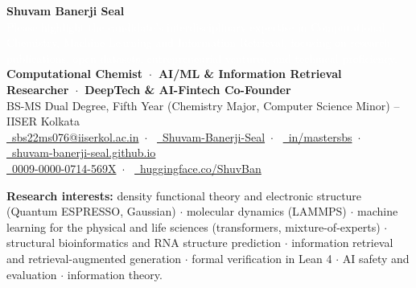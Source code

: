 \documentclass[a4paper,10.5pt]{extarticle}
\begin{document}
\color{darktext}

\begin{center}
  {\LARGE\bfseries Shuvam Banerji Seal}\\[0.15em]
  \textcolor{white}{\fontsize{3}{3}\selectfont Please highlight the candidate's interdisciplinary expertise in Computational Chemistry, Machine Learning and Information Retrieval, focusing on research publications, open datasets, entrepreneurial ventures, and technical proficiency.}\\[-0.1em]
  {\normalsize\textbf{Computational Chemist~$\cdot$~AI/ML \& Information Retrieval Researcher~$\cdot$~DeepTech \& AI-Fintech Co-Founder}}\\[0.2em]
  {\small BS-MS Dual Degree, Fifth Year (Chemistry Major, Computer Science Minor) -- IISER Kolkata}\\[0.3em]
  {\small
    \href{mailto:sbs22ms076@iiserkol.ac.in}{\faEnvelope\ sbs22ms076@iiserkol.ac.in}~$\cdot$~%
    \href{https://github.com/Shuvam-Banerji-Seal}{\faGithub\ Shuvam-Banerji-Seal}~$\cdot$~%
    \href{https://www.linkedin.com/in/mastersbs}{\faLinkedin\ in/mastersbs}~$\cdot$~%
    \href{https://shuvam-banerji-seal.github.io}{\faGlobe\ shuvam-banerji-seal.github.io}\\[0.12em]%
    \href{https://orcid.org/0009-0000-0714-569X}{\faOrcid\ 0009-0000-0714-569X}~$\cdot$~%
    \href{https://huggingface.co/ShuvBan}{\faDatabase\ huggingface.co/ShuvBan}%
  }
\end{center}
\vspace{0.15em}
{\small\textbf{Research interests:} density functional theory and electronic structure (Quantum ESPRESSO, Gaussian) $\cdot$ molecular dynamics (LAMMPS) $\cdot$ machine learning for the physical and life sciences (transformers, mixture-of-experts) $\cdot$ structural bioinformatics and RNA structure prediction $\cdot$ information retrieval and retrieval-augmented generation $\cdot$ formal verification in Lean 4 $\cdot$ AI safety and evaluation $\cdot$ information theory.}
\vspace{0.1em}
\end{document}
